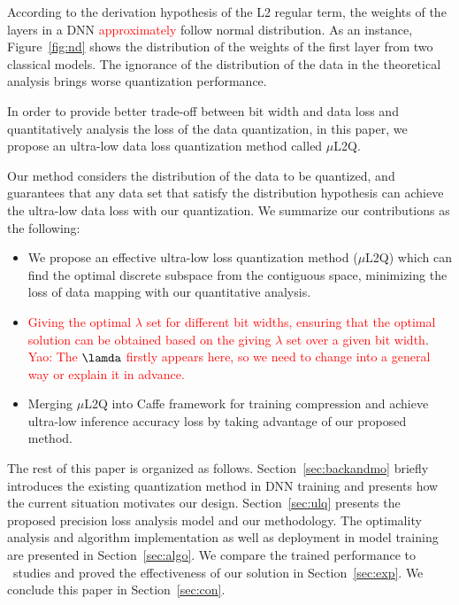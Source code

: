 According to the derivation hypothesis \citep{nasrabadi2007pattern} of the L2 regular term, the weights of the layers in a DNN \textcolor{red}{approximately} follow normal distribution. 
As an instance, Figure~\ref{fig:nd} shows the distribution of the weights of the first layer from two classical models.
The ignorance of the distribution of the data in the theoretical analysis brings worse quantization performance.

In order to provide better trade-off between bit width and data loss and quantitatively analysis the loss of the data quantization, in this paper, we propose an ultra-low data loss quantization method called $\mu$L2Q. 

Our method considers the distribution of the data to be quantized, and guarantees 
that any data set that satisfy the distribution hypothesis can achieve the ultra-low data loss with our quantization.
We summarize our contributions as the following:
\begin{itemize}
    \item We propose an effective ultra-low loss quantization  method  ($\mu$L2Q)  which  can  find  the  optimal discrete subspace from the contiguous space, minimizing the loss of data  mapping with our quantitative analysis.
    \item \textcolor{red}{Giving the optimal $\lambda$ set for different  bit  widths, ensuring that the optimal solution can be obtained based on the giving $\lambda$ set over a given bit width}. \textcolor{red}{Yao: The $\lamda$ firstly appears here, so we need to change into a general way or explain it in advance.}
    \item Merging $\mu$L2Q into Caffe framework for training compression and achieve ultra-low inference accuracy loss by taking advantage of our proposed method.
\end{itemize}

The rest of this paper is organized as follows. Section~\ref{sec:backandmo} briefly introduces the existing quantization method in DNN training and presents how the current situation motivates our design. Section~\ref{sec:ulq} presents the proposed precision loss analysis model and our methodology. The optimality analysis and algorithm implementation as well as deployment in model training are presented in Section~\ref{sec:algo}. We compare the trained performance to \sArt ~studies and proved the effectiveness of our solution in Section~\ref{sec:exp}. We conclude this paper in Section~\ref{sec:con}.